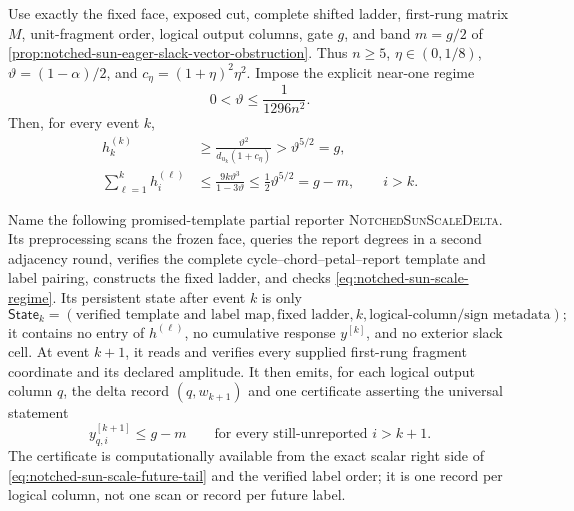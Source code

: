 \begin{theorem}
\label{thm:notched-sun-scale-delta-reporter}
Use exactly the fixed face, exposed cut, complete shifted ladder, first-rung
matrix $M$, unit-fragment order, logical output columns, gate $g$, and band
$m=g/2$ of
\cref{prop:notched-sun-eager-slack-vector-obstruction}.  Thus $n\geq5$,
$\eta\in(0,1/8)$, $\vartheta=(1-\alpha)/2$, and
$c_\eta=(1+\eta)^2\eta^2$.  Impose the explicit near-one regime
\begin{equation}
 0<\vartheta\leq\frac1{1296n^2}.
 \label{eq:notched-sun-scale-regime}
\end{equation}
Then, for every event $k$,
\begin{align}
 h_k^{(k)}
 &\geq\frac{\vartheta^2}{d_{u_k}(1+c_\eta)}
 >\vartheta^{5/2}=g,
 \label{eq:notched-sun-scale-matching}\\
 \sum_{\ell=1}^k h_i^{(\ell)}
 &\leq\frac{9k\vartheta^3}{1-3\vartheta}
 \leq\frac12\vartheta^{5/2}=g-m,
 \qquad i>k.
 \label{eq:notched-sun-scale-future-tail}
\end{align}

Name the following promised-template partial reporter
\textsc{NotchedSunScaleDelta}.  Its preprocessing scans the frozen face,
queries the report degrees in a second adjacency round, verifies the complete
cycle--chord--petal--report template and label pairing, constructs the fixed
ladder, and checks \cref{eq:notched-sun-scale-regime}.  Its persistent state
after event $k$ is only
\begin{equation}
 \mathsf{State}_k
 =(\text{verified template and label map},\text{fixed ladder},k,
   \text{logical-column/sign metadata});
 \label{eq:notched-sun-scale-state}
\end{equation}
it contains no entry of $h^{(\ell)}$, no cumulative response $y^{[k]}$, and
no exterior slack cell.  At event $k+1$, it reads and verifies every supplied
first-rung fragment coordinate and its declared amplitude.  It then emits,
for each logical output column $q$, the delta record $(q,w_{k+1})$ and one
certificate asserting the universal statement
\begin{equation*}
 y_{q,i}^{[k+1]}\leq g-m
 \qquad\text{for every still-unreported }i>k+1.
\end{equation*}
The certificate is computationally available from the exact scalar right side
of \cref{eq:notched-sun-scale-future-tail} and the verified label order; it is
one record per logical column, not one scan or record per future label.


\end{theorem}
